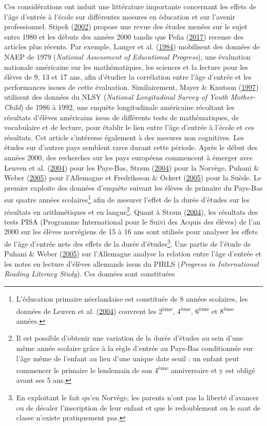 \documentclass[
]{book}
\begin{document}
\quad Ces considérations ont induit une littérature importante concernant les effets de l'âge d'entrée à l'école sur différentes mesures en éducation et sur l'avenir professionnel. Stipek (\protect\hyperlink{ref-STI:02}{2002}) propose une revue des études menées sur le sujet entre 1980 et les débuts des années 2000 tandis que Peña (\protect\hyperlink{ref-PEN:17}{2017}) recense des articles plus récents. Par exemple, Langer et al. (\protect\hyperlink{ref-LAN:eal:84}{1984}) mobilisent des données de NAEP de 1979 (\emph{National Assessment of Educational Progress}), une évaluation nationale américaine sur les mathématiques, les sciences et la lecture pour les élèves de 9, 13 et 17 ans, afin d'étudier la corrélation entre l'âge d'entrée et les performances issues de cette évaluation. Similairement, Mayer \& Knutson (\protect\hyperlink{ref-MAY:KNU:97}{1997}) utilisent des données du NLSY (\emph{National Longitudinal Survey of Youth Mother-Child}) de 1986 à 1992, une enquête longitudinale américaine récoltant les résultats d'élèves américains issus de différents tests de mathématiques, de vocabulaire et de lecture, pour établir le lien entre l'âge d'entrée à l'école et ces résultats. Cet article s'intéresse également à des mesures non cognitives. Les études sur d'autres pays semblent rares durant cette période. Après le début des années 2000, des recherches sur les pays européens commencent à émerger avec Leuven et al. (\protect\hyperlink{ref-LEU:eal:04}{2004}) pour les Pays-Bas, Strøm (\protect\hyperlink{ref-STO:04}{2004}) pour la Norvège, Puhani \& Weber (\protect\hyperlink{ref-PUH:WEB:05}{2005}) pour l'Allemagne et Fredriksson \& Ockert (\protect\hyperlink{ref-FRE:OCK:05}{2005}) pour la Suède. Le premier exploite des données d'enquête suivant les élèves de primaire du Pays-Bas sur quatre années scolaires\footnote{L'éducation primaire néerlandaise est constituée de 8 années scolaires, les données de Leuven et al. (\protect\hyperlink{ref-LEU:eal:04}{2004}) couvrent les 2\textsuperscript{ème}, 4\textsuperscript{ème}, 6\textsuperscript{ème} et 8\textsuperscript{ème} années.} afin de mesurer l'effet de la durée d'études sur les résultats en arithmétiques et en langue\footnote{Il est possible d'obtenir une variation de la durée d'études au sein d'une même année scolaire grâce à la règle d'entrée au Pays-Bas conditionnée sur l'âge même de l'enfant au lieu d'une unique date seuil : un enfant peut commencer le primaire le lendemain de son 4\textsuperscript{ème} anniversaire et y est obligé avant ses 5 ans.}. Quant à Strøm (\protect\hyperlink{ref-STO:04}{2004}), les résultats des tests PISA (Programme International pour le Suivi des Acquis des élèves) de l'an 2000 sur les élèves norvégiens de 15 à 16 ans sont utilisés pour analyser les effets de l'âge d'entrée nets des effets de la durée d'études\footnote{En exploitant le fait qu'en Norvège, les parents n'ont pas la liberté d'avancer ou de décaler l'inscription de leur enfant et que le redoublement ou le saut de classe n'existe pratiquement pas.}. Une partie de l'étude de Puhani \& Weber (\protect\hyperlink{ref-PUH:WEB:05}{2005}) sur l'Allemagne analyse la relation entre l'âge d'entrée et les notes en lecture d'élèves allemands issus du PIRLS (\emph{Progress in International Reading Literacy Study}). Ces données sont constituées 
\end{document}
